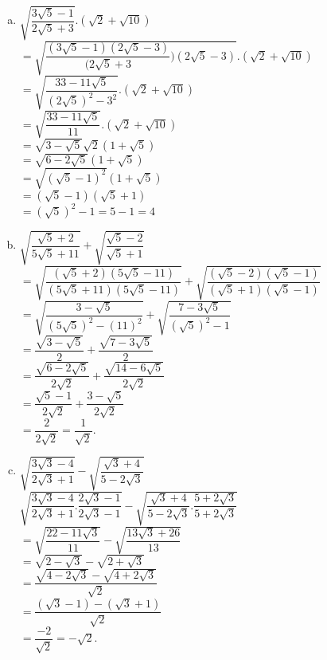 \begin{bt}
{\begin{enumerate}[a)]
			$=\sqrt{\dfrac{1}{8+3\sqrt{7}}}.\sqrt{2} (3+\sqrt{7}) $\\
			$=\sqrt{\dfrac{2}{16+6\sqrt{7}}}(3+\sqrt{7}) $\\
			$=\sqrt{\dfrac{2}{(\sqrt{7}+\sqrt{3})^2}}(3+\sqrt{7}) $\\
			$=\sqrt{2}$.
			\item  $\sqrt{\dfrac{3\sqrt{5}-1}{2\sqrt{5}+3}}.(\sqrt{2}+\sqrt{10}) $\\
			$=\sqrt{\dfrac{(3\sqrt{5}-1)(2\sqrt{5}-3)}{(2\sqrt{5}+3})(2\sqrt{5}-3)}.(\sqrt{2}+\sqrt{10}) $\\
			$=\sqrt{\dfrac{33-11\sqrt{5}}{(2\sqrt{5})^2-3^2}}.(\sqrt{2}+\sqrt{10}) $\\
			$=\sqrt{\dfrac{33-11\sqrt{5}}{11}}.(\sqrt{2}+\sqrt{10}) $\\
			$=\sqrt{3-\sqrt{5}}\sqrt{2}(1+\sqrt{5})$\\
			$=\sqrt{6-2\sqrt{5}}(1+\sqrt{5})$\\
			$=\sqrt{(\sqrt{5}-1)^2}(1+\sqrt{5})$\\
			$=(\sqrt{5}-1)(\sqrt{5}+1)$\\
			$=(\sqrt{5})^2-1=5-1=4$
			\item $\sqrt{\dfrac{\sqrt{5}+2}{5\sqrt{5}+11}}+\sqrt{\dfrac{\sqrt{5}-2}{\sqrt{5}+1}} $\\
			$=\sqrt{\dfrac{(\sqrt{5}+2)(5\sqrt{5}-11)}{(5\sqrt{5}+11)(5\sqrt{5}-11)}}+\sqrt{\dfrac{(\sqrt{5}-2)(\sqrt{5}-1)}{(\sqrt{5}+1)(\sqrt{5}-1)}} $\\
			$=\sqrt{\dfrac{3-\sqrt{5}}{(5\sqrt{5})^2-(11)^2}}+\sqrt{\dfrac{7-3\sqrt{5}}{(\sqrt{5})^2-1}}$\\
			$=\dfrac{\sqrt{3-\sqrt{5}}}{2}+\dfrac{\sqrt{7-3\sqrt{5}}}{2}$\\
			$=\dfrac{\sqrt{6-2\sqrt{5}}}{2\sqrt{2}}+\dfrac{\sqrt{14-6\sqrt{5}}}{2\sqrt{2}}$\\
			$=\dfrac{\sqrt{5}-1}{2\sqrt{2}}+\dfrac{3-\sqrt{5}}{2\sqrt{2}}$\\
			$=\dfrac{2}{2\sqrt{2}}=\dfrac{1}{\sqrt{2}}$.
			\item $\sqrt{\dfrac{3\sqrt{3}-4}{2\sqrt{3}+1}}-\sqrt{\dfrac{\sqrt{3}+4}{5-2\sqrt{3}}} $\\
			$\sqrt{\dfrac{3\sqrt{3}-4}{2\sqrt{3}+1}.\dfrac{2\sqrt{3}-1}{2\sqrt{3}-1}}-\sqrt{\dfrac{\sqrt{3}+4}{5-2\sqrt{3}}.\dfrac{5+2\sqrt{3}}{5+2\sqrt{3}}} $\\
			$=\sqrt{\dfrac{22-11\sqrt{3}}{11}}-\sqrt{\dfrac{13\sqrt{3}+26}{13}}$\\
			$=\sqrt{2-\sqrt{3}}-\sqrt{2+\sqrt{3}}$\\
			$=\dfrac{\sqrt{4-2\sqrt{3}}-\sqrt{4+2\sqrt{3}}}{\sqrt{2}}$\\
			$=\dfrac{(\sqrt{3}-1)-(\sqrt{3}+1)}{\sqrt{2}}$\\
			$=\dfrac{-2}{\sqrt{2}}=-\sqrt{2}$.
			
	\end{enumerate}}
\end{bt}
